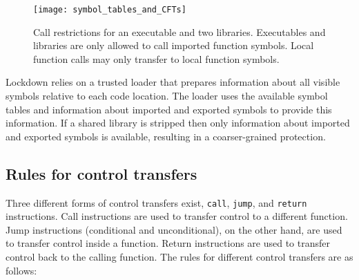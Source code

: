 \documentclass{acm_proc_article-sp}
\begin{document}
\begin{figure*}
  \begin{center}
    \texttt{[image: symbol\_tables\_and\_CFTs]}
    \caption{Call restrictions for an executable and two libraries.
    Executables and libraries are only allowed to call imported 
    function symbols. Local function calls may only transfer to local function
		symbols.}
    \label{fig:call-restrictions}
  \end{center}
\end{figure*}

Lockdown relies on a trusted loader that prepares information about all visible
symbols relative to each code location. The loader uses the available symbol
tables and information about imported and exported symbols to provide this
information. If a shared library is stripped then only information about
imported and exported symbols is available, resulting in a coarser-grained
protection. 

\newpage
\subsection{Rules for control transfers}\label{sec:rules}


Three different forms of control transfers exist, \texttt{call}, \texttt{jump},
and \texttt{return} instructions. Call instructions are used to transfer control
to a different function. Jump instructions (conditional and unconditional), on
the other hand, are used to transfer control inside a function. Return
instructions are used to transfer control back to the calling function. The
rules for different control transfers are as follows:
\end{document}
